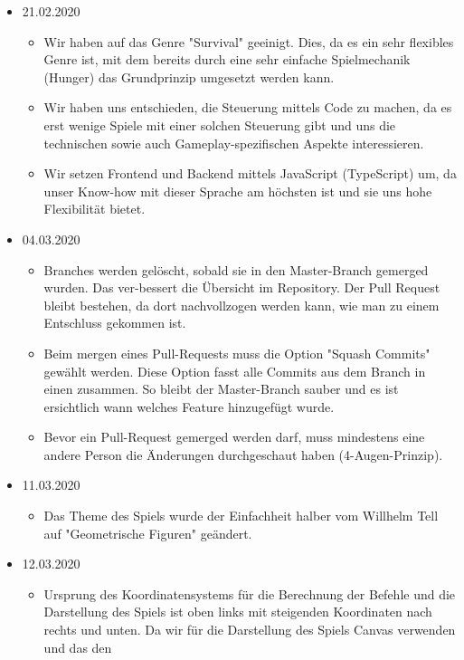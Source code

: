 \documentclass[a4paper, 11pt]{scrartcl}
\begin{document}
\begin{itemize}
  \item 21.02.2020
        \begin{itemize}
          \item Wir haben auf das Genre "Survival" geeinigt. Dies, da es ein sehr flexibles Genre ist, mit dem bereits durch eine sehr einfache Spielmechanik (Hunger) das Grundprinzip umgesetzt werden kann.
          \item Wir haben uns entschieden, die Steuerung mittels Code zu machen, da es erst wenige Spiele mit einer solchen Steuerung gibt und uns die technischen sowie auch Gameplay-spezifischen Aspekte interessieren.
          \item Wir setzen Frontend und Backend mittels JavaScript (TypeScript) um, da unser Know-how mit dieser Sprache am höchsten ist und sie uns hohe Flexibilität bietet.
        \end{itemize}
  \item 04.03.2020
        \begin{itemize}
          \item Branches werden gelöscht, sobald sie in den Master-Branch gemerged wurden. Das ver-bessert die Übersicht im Repository. Der Pull Request bleibt bestehen, da dort nachvollzogen werden kann, wie man zu einem Entschluss gekommen ist.
          \item Beim mergen eines Pull-Requests muss die Option "Squash Commits" gewählt werden. Diese Option fasst alle Commits aus dem Branch in einen zusammen. So bleibt der Master-Branch sauber und es ist ersichtlich wann welches Feature hinzugefügt wurde.
          \item Bevor ein Pull-Request gemerged werden darf, muss mindestens eine andere Person die Änderungen durchgeschaut haben (4-Augen-Prinzip).
        \end{itemize}
  \item 11.03.2020
        \begin{itemize}
          \item Das Theme des Spiels wurde der Einfachheit halber vom Willhelm Tell auf "Geometrische Figuren" geändert.
        \end{itemize}
  \item 12.03.2020
        \begin{itemize}
          \item Ursprung des Koordinatensystems für die Berechnung der Befehle und die Darstellung des Spiels ist oben links
                mit steigenden Koordinaten nach rechts und unten. Da wir für die Darstellung des Spiels Canvas verwenden und das den

\end{itemize}
\end{itemize}
\end{document}
